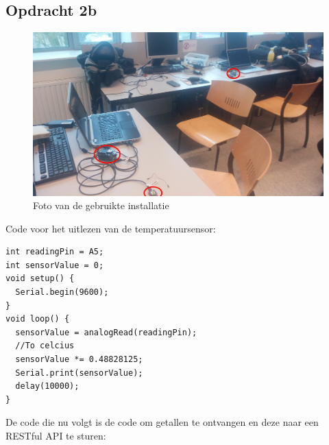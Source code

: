 \documentclass[12pt]{article}
\begin{document}
\subsection{Opdracht 2b}
\begin{center}
\begin{figure}[h]
\includegraphics[scale=0.7]{Setup_3.jpg}
\caption{Foto van de gebruikte installatie}
\label{fig:output8}
\end{figure}   
\end{center}
Code voor het uitlezen van de temperatuursensor:
\begin{lstlisting}
int readingPin = A5;
int sensorValue = 0;
void setup() {
  Serial.begin(9600);
}
void loop() {
  sensorValue = analogRead(readingPin);
  //To celcius 
  sensorValue *= 0.48828125;
  Serial.print(sensorValue);
  delay(10000);
}
\end{lstlisting}
De code die nu volgt is de code om getallen te ontvangen en deze naar een RESTful API te sturen:
\end{document}
